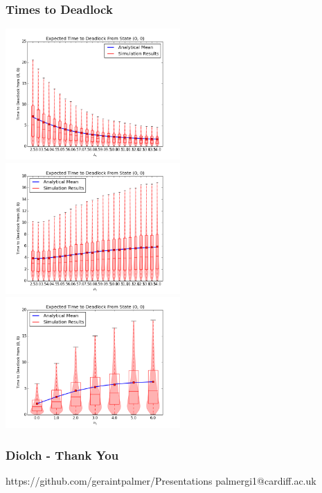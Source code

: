 \documentclass[xcolor={table}]{beamer}
\begin{document}
\begin{frame}
    \frametitle{Times to Deadlock}
    \includegraphics[width=0.5\textwidth]{vary_L1fb}
    \includegraphics[width=0.5\textwidth]{vary_mu1fb}\newline
    \centering
    \includegraphics[width=0.5\textwidth]{vary_n1fb}
\end{frame}


\begin{frame}
    \frametitle{Diolch - Thank You}
    https://github.com/geraintpalmer/Presentations
    palmergi1@cardiff.ac.uk
\end{frame}
\end{document}
